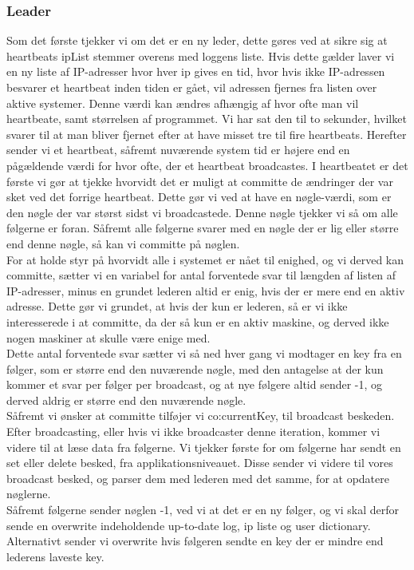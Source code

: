 \documentclass[a4paper,12pt]{article}
\begin{document}
\subsubsection{Leader}
Som det første tjekker vi om det er en ny leder, dette gøres ved at sikre sig at heartbeats ipList stemmer overens med loggens liste. Hvis dette gælder laver vi en ny liste af IP-adresser hvor hver ip gives en tid, hvor hvis ikke IP-adressen besvarer et heartbeat inden tiden er gået, vil adressen fjernes fra listen over aktive systemer. Denne værdi kan ændres afhængig af hvor ofte man vil heartbeate, samt størrelsen af programmet. Vi har sat den til to sekunder, hvilket svarer til at man bliver fjernet efter at have misset tre til fire heartbeats. 
Herefter sender vi et heartbeat, såfremt nuværende system tid er højere end en pågældende værdi for hvor ofte, der et heartbeat broadcastes. I heartbeatet er det første vi gør at tjekke hvorvidt det er muligt at committe de ændringer der var sket ved det forrige heartbeat. Dette gør vi ved at have en nøgle-værdi, som er den nøgle der var størst sidst vi broadcastede. Denne nøgle tjekker vi så om alle følgerne er foran. Såfremt alle følgerne svarer med en nøgle der er lig eller større end denne nøgle, så kan vi committe på nøglen.
\\
For at holde styr på hvorvidt alle i systemet er nået til enighed, og vi derved kan committe, sætter vi en variabel for antal forventede svar til længden af listen af IP-adresser, minus en grundet lederen altid er enig, hvis der er mere end en aktiv adresse. Dette gør vi grundet, at hvis der kun er lederen, så er vi ikke interesserede i at committe, da der så kun er en aktiv maskine, og derved ikke nogen maskiner at skulle være enige med.
\\[5px]
Dette antal forventede svar sætter vi så ned hver gang vi modtager en key fra en følger, som er større end den nuværende nøgle, med den antagelse at der kun kommer et svar per følger per broadcast, og at nye følgere altid sender -1, og derved aldrig er større end den nuværende nøgle.
\\
Såfremt vi ønsker at committe tilføjer vi co:currentKey, til broadcast beskeden.
Efter broadcasting, eller hvis vi ikke broadcaster denne iteration, kommer vi videre til at læse data fra følgerne. Vi tjekker første for om følgerne har sendt en set eller delete besked, fra applikationsniveauet. Disse sender vi videre til vores broadcast besked, og parser dem med lederen med det samme, for at opdatere nøglerne.
\\
Såfremt følgerne sender nøglen -1, ved vi at det er en ny følger, og vi skal derfor sende en overwrite indeholdende up-to-date log, ip liste og user dictionary. Alternativt sender vi overwrite hvis følgeren sendte en key der er mindre end lederens laveste key.
\end{document}
